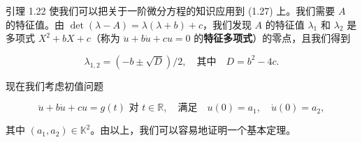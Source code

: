 引理 1.22 使我们可以把关于一阶微分方程的知识应用到 (1.27) 上。我们需要 $ A $ 的特征值。由 $ \det(\lambda - A) = \lambda(\lambda + b) + c $，我们发现 $ A $ 的特征值 $ \lambda_{1} $ 和 $ \lambda_{2} $ 是多项式 $ X^{2} + bX + c $（称为 $ \ddot{u} + b\dot{u} + cu = 0 $ 的\textbf{特征多项式}）的零点，且我们得到

\[
\lambda_{1,2} = \left( -b \pm \sqrt{D} \right)/2 , \quad \text{其中} \quad D = b^{2} - 4c .
\]

现在我们考虑初值问题

\begin{equation}
\ddot{u} + b\dot{u} + cu = g(t) \text{ 对 } t \in \mathbb{R} , \quad \text{满足} \quad u(0) = a_{1} , \quad \dot{u}(0) = a_{2} ,\tag{1.31}
\end{equation}

其中 $ (a_{1},a_{2}) \in \mathbb{K}^{2} $。由以上，我们可以容易地证明一个基本定理。


